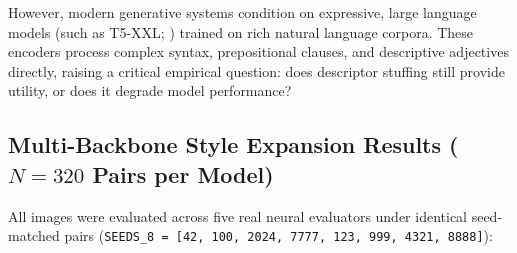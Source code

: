 \documentclass[10pt,twocolumn,letterpaper]{article}
\begin{document}
However, modern generative systems condition on expressive, large language models (such as T5-XXL; \citealp{raffel2020exploring}) trained on rich natural language corpora. These encoders process complex syntax, prepositional clauses, and descriptive adjectives directly, raising a critical empirical question: does descriptor stuffing still provide utility, or does it degrade model performance?

\subsection{\texorpdfstring{Multi-Backbone Style Expansion Results ($N = 320$ Pairs per Model)}{Multi-Backbone Style Expansion Results (N = 320 Pairs per Model)}}

All images were evaluated across five real neural evaluators under identical seed-matched pairs (\texttt{SEEDS\_8 = [42, 100, 2024, 7777, 123, 999, 4321, 8888]}):
\end{document}
